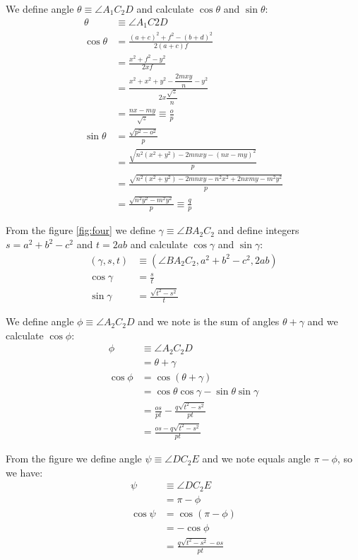 \documentclass[11pt]{article}
\begin{document}
We define angle $\theta \equiv \angle{A_1C_2D}$ and calculate $\cos\theta$ and $\sin\theta$:
\begin{align}
\theta &\equiv \angle{A_1C2D}\\
\cos\theta &= \frac{(a+c)^2 + f^2 - (b+d)^2}{2(a+c)f}\nonumber\\
 &= \frac{x^2 + f^2 - y^2}{2xf}\nonumber\\
 &= \frac{x^2 + x^2 + y^2 - \dfrac{2mxy}{n} - y^2}{2x\dfrac{\sqrt{z}}{n}}\nonumber\\
 &= \frac{nx - my}{\sqrt{z}} \equiv \frac{o}p\\
\sin\theta &= \frac{\sqrt{p^2 - o^2}}p\nonumber\\
 &= \frac{\sqrt{n^2(x^2 + y^2) - 2mnxy - (nx-my)^2}}p\nonumber\\
 &= \frac{\sqrt{n^2(x^2 + y^2) - 2mnxy - n^2x^2 +2nxmy - m^2y^2}}p\nonumber\\
 &= \frac{\sqrt{n^2y^2 - m^2y^2}}p \equiv \frac{q}{p}
\end{align}

From the figure \ref{fig:four} we define $\gamma \equiv \angle{BA_2C_2}$ and define integers $s=a^2 + b^2 - c^2$ and $t=2ab$ and calculate $\cos\gamma$ and $\sin\gamma$:
\begin{align}
(\gamma,s,t) &\equiv (\angle{BA_2C_2}, a^2 + b^2 - c^2, 2ab)\\
\cos\gamma &= \frac{s}{t}\\
\sin\gamma &= \frac{\sqrt{t^2-s^2}}{t}
\end{align}

We define angle $\phi \equiv \angle{A_2C_2D}$ and we note is the sum of angles $\theta + \gamma$ and we calculate $\cos\phi$:
\begin{align}
\phi &\equiv \angle{A_2C_2D}\\
 &= \theta + \gamma\\
\cos\phi &= \cos(\theta + \gamma)\\
 &= \cos\theta\cos\gamma - \sin\theta\sin\gamma\nonumber\\
 &= \frac{os}{pt} - \frac{q\sqrt{t^2-s^2}}{pt}\nonumber\\
 &= \frac{os - q\sqrt{t^2-s^2}}{pt}
\end{align}

From the figure we define angle $\psi \equiv \angle{DC_2E}$ and we note equals angle $\pi - \phi$, so we have:
\begin{align}
\psi &\equiv \angle{DC_2E}\\
 &= \pi - \phi\\
\cos\psi &= \cos(\pi - \phi)\\
 &= -\cos\phi\nonumber\\
 &= \frac{q\sqrt{t^2-s^2} - os}{pt}
\end{align}
\end{document}
